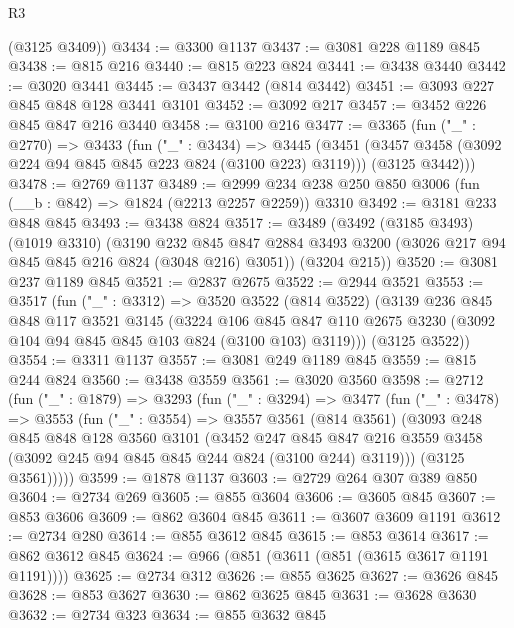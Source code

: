 \begin{lexlean}{R3}
\begin{coremodule}
      (@3125 @3409))
@3434 := @3300 @1137
@3437 := @3081 @228 @1189 @845
@3438 := @815 @216
@3440 := @815 @223 @824
@3441 := @3438 @3440
@3442 := @3020 @3441
@3445 := @3437 @3442 (@814 @3442)
@3451 := @3093 @227 @845 @848 @128 @3441 @3101
@3452 := @3092 @217
@3457 := @3452 @226 @845 @847 @216 @3440
@3458 := @3100 @216
@3477 := @3365
    (fun ("_" : @2770) =>
    @3433
      (fun ("_" : @3434) =>
      @3445
        (@3451 (@3457 @3458 (@3092 @224 @94 @845 @845 @223 @824 (@3100 @223) @3119)))
        (@3125 @3442)))
@3478 := @2769 @1137
@3489 := @2999 @234 @238 @250 @850 @3006 (fun (__b : @842) => @1824 (@2213 @2257 @2259)) @3310
@3492 := @3181 @233 @848 @845
@3493 := @3438 @824
@3517 := @3489
    (@3492
      (@3185 @3493)
      (@1019 @3310)
      (@3190
        @232
        @845
        @847
        @2884
        @3493
        @3200
        (@3026 @217 @94 @845 @845 @216 @824 (@3048 @216) @3051))
      (@3204 @215))
@3520 := @3081 @237 @1189 @845
@3521 := @2837 @2675
@3522 := @2944 @3521
@3553 := @3517
    (fun ("_" : @3312) =>
    @3520
      @3522
      (@814 @3522)
      (@3139
        @236
        @845
        @848
        @117
        @3521
        @3145
        (@3224
          @106
          @845
          @847
          @110
          @2675
          @3230
          (@3092 @104 @94 @845 @845 @103 @824 (@3100 @103) @3119)))
      (@3125 @3522))
@3554 := @3311 @1137
@3557 := @3081 @249 @1189 @845
@3559 := @815 @244 @824
@3560 := @3438 @3559
@3561 := @3020 @3560
@3598 := @2712
    (fun ("_" : @1879) =>
    @3293
      (fun ("_" : @3294) =>
      @3477
        (fun ("_" : @3478) =>
        @3553
          (fun ("_" : @3554) =>
          @3557
            @3561
            (@814 @3561)
            (@3093
              @248
              @845
              @848
              @128
              @3560
              @3101
              (@3452
                @247
                @845
                @847
                @216
                @3559
                @3458
                (@3092 @245 @94 @845 @845 @244 @824 (@3100 @244) @3119)))
            (@3125 @3561)))))
@3599 := @1878 @1137
@3603 := @2729 @264 @307 @389 @850
@3604 := @2734 @269
@3605 := @855 @3604
@3606 := @3605 @845
@3607 := @853 @3606
@3609 := @862 @3604 @845
@3611 := @3607 @3609 @1191
@3612 := @2734 @280
@3614 := @855 @3612 @845
@3615 := @853 @3614
@3617 := @862 @3612 @845
@3624 := @966 (@851 (@3611 (@851 (@3615 @3617 @1191 @1191))))
@3625 := @2734 @312
@3626 := @855 @3625
@3627 := @3626 @845
@3628 := @853 @3627
@3630 := @862 @3625 @845
@3631 := @3628 @3630
@3632 := @2734 @323
@3634 := @855 @3632 @845

\end{coremodule}
\end{lexlean}
